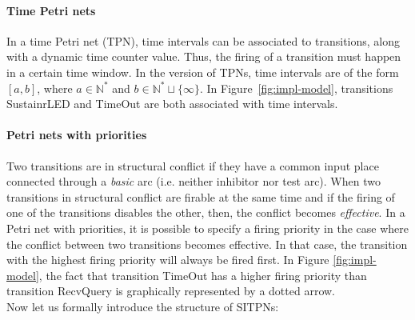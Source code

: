 \paragraph{Time Petri nets}

In a time Petri net (TPN), time intervals can be associated to
transitions, along with a dynamic time counter value. Thus, the firing
of a transition must happen in a certain time window. In the
\hilecop{} version of TPNs, time intervals are of the form $[a, b]$,
where $a\in\mathbb{N}^{*}$ and
$b\in\mathbb{N}^{*}\sqcup\{\infty\}$. %
In Figure~\ref{fig:impl-model},
transitions SustainrLED and TimeOut are both associated with time
intervals.

\paragraph{Petri nets with priorities}

Two transitions are in structural conflict if they have a common input
place connected through a \textit{basic} arc (i.e. neither inhibitor
nor test arc). When two transitions in structural conflict are firable
at the same time and if the firing of one of the transitions disables
the other, then, the conflict becomes \textit{effective}. In a Petri
net with priorities, it is possible to specify a firing priority in
the case where the conflict between two transitions becomes
effective. In that case, the transition with the highest firing
priority will always be fired first. In Figure \ref{fig:impl-model},
the fact that transition TimeOut has a higher firing priority than
transition RecvQuery is graphically represented by a dotted arrow. \\

\noindent{}Now let us formally introduce the structure of SITPNs:

